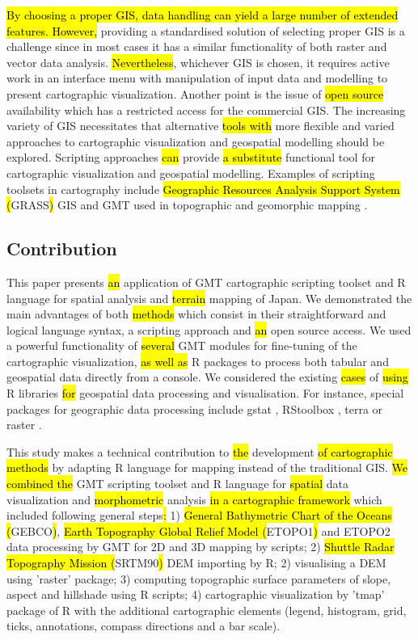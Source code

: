 \documentclass[land,article,submit,pdftex,moreauthors]{Definitions/mdpi}
\begin{document}
\hl{By choosing a proper GIS, data handling can yield a large number of extended features. However, }providing a standardised solution of selecting proper GIS is a challenge since in most cases it has a similar functionality of both raster and vector data analysis. \hl{Nevertheless}, whichever GIS is chosen, it requires active work in an interface menu with manipulation of input data and modelling to present cartographic visualization. Another point is the issue of \hl{open source }availability which has a restricted access for the commercial GIS. The increasing variety of GIS necessitates that alternative\hl{ tools with }more flexible and varied approaches to cartographic visualization and geospatial modelling should be explored.\hl{ }Scripting approaches \hl{can} provide \hl{a substitute} functional tool for cartographic visualization and geospatial modelling. Examples of scripting toolsets in cartography include \hl{Geographic Resources Analysis Support System (}GRASS\hl{)} GIS \cite{Lemenkova202016,Lemenkova202026} and GMT used in topographic and geomorphic mapping \cite{ijgi11090473,geosciences12030140}. 

\subsection{Contribution}

This paper presents \hl{an} application of GMT cartographic scripting toolset \cite{Wesseletal2019} and R language \cite{RCoreTeam} for spatial analysis and \hl{terrain }mapping of\hl{ }Japan. We demonstrated the main advantages of both \hl{methods} which consist in their straightforward and logical language syntax, a scripting approach and \hl{an }open source access. We used a powerful functionality of \hl{several }GMT modules for fine-tuning of the cartographic visualization, \hl{as well as }R packages to process both tabular and geospatial data directly from a console. We considered the existing \hl{cases} of \hl{using} R libraries \hl{for} geospatial data processing and visualisation. For instance, special packages for geographic data processing include gstat \cite{HENGL20081886}, RStoolbox \cite{app122412554}, terra or raster \cite{jimaging8120317}.

This study makes a technical contribution to \hl{the} development \hl{of cartographic methods }by adapting R language for mapping instead of the traditional GIS. \hl{We combined the} GMT scripting toolset and R language for \hl{spatial} data visualization and \hl{morphometric} analysis \hl{in a cartographic framework }which included following general steps\hl{: }1) \hl{General Bathymetric Chart of the Oceans (}GEBCO\hl{)}, \hl{Earth Topography Global Relief Model (}ETOPO1\hl{)} and ETOPO2 data processing by GMT for 2D and 3D mapping by scripts; 2) \hl{Shuttle Radar Topography Mission (}SRTM90\hl{) }DEM importing by R; 2) visualising a DEM using 'raster' package; 3) computing topographic surface parameters of slope, aspect and hillshade using R scripts; 4) cartographic visualization by 'tmap' package of R with the additional cartographic elements (legend, histogram, grid, ticks, annotations, compass directions and a bar scale). 
\end{document}
